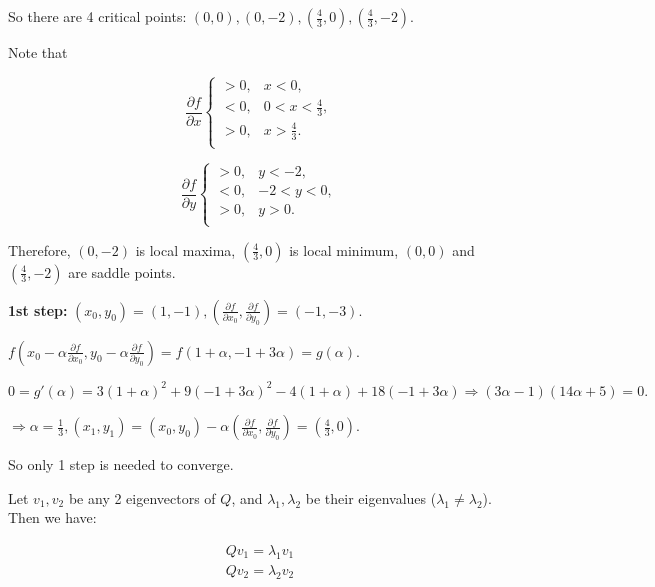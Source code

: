\documentclass[
  course = {{16-811 Math Fundamentals for Robotics}},
  quartile = {{1}},
  assignment = 4,
  name = {{Kangle Deng}},
  email = {{kangled@andrew.cmu.edu}},
  firstexercise = 1
]{aga-homework}
\begin{document}
So there are 4 critical points: $(0, 0), (0, -2), (\frac{4}{3}, 0), (\frac{4}{3}, -2)$.

Note that 

\begin{equation*}
    \frac{\partial f}{\partial x} 
    \begin{cases}
> 0, & x<0,\\
< 0,& 0 < x < \frac{4}{3},\\
> 0, & x > \frac{4}{3}.\\
\end{cases}
\end{equation*}

\begin{equation*}
    \frac{\partial f}{\partial y} 
    \begin{cases}
> 0, & y < -2,\\
< 0,& -2 < y < 0,\\
> 0, & y > 0.\\
\end{cases}
\end{equation*}

Therefore, $(0,-2)$ is local maxima, $(\frac{4}{3}, 0)$ is local minimum, $(0,0)$ and $(\frac{4}{3}, -2)$ are saddle points.

\subexercise
\noindent\textbf{1st step:} $(x_0, y_0) = (1, -1), (\frac{\partial f}{\partial x_0}, \frac{\partial f}{\partial y_0})= (-1, -3)$.

$f(x_0-\alpha \frac{\partial f}{\partial x_0}, y_0 - \alpha \frac{\partial f}{\partial y_0}) = f(1 + \alpha, -1 + 3\alpha) = g(\alpha).$

$0 = g'(\alpha) = 3(1+\alpha)^2 + 9(-1+3\alpha)^2 - 4(1+\alpha) + 18(-1+3\alpha) \Rightarrow (3\alpha - 1)(14 \alpha + 5) = 0.$

$\Rightarrow \alpha = \frac{1}{3}, (x_1, y_1) = (x_0, y_0) - \alpha (\frac{\partial f}{\partial x_0}, \frac{\partial f}{\partial y_0}) = (\frac{4}{3}, 0)$.

So only 1 step is needed to converge.

\exercise
\subexercise
Let $v_1, v_2$ be any 2 eigenvectors of $Q$, and $\lambda_1, \lambda_2$ be their eigenvalues ($\lambda_1 \ne \lambda_2$). Then we have:

\begin{equation*}
    \begin{aligned}
    Qv_1 = \lambda_1 v_1 \\
    Qv_2 = \lambda_2 v_2
    \end{aligned}
\end{equation*}
\end{document}
